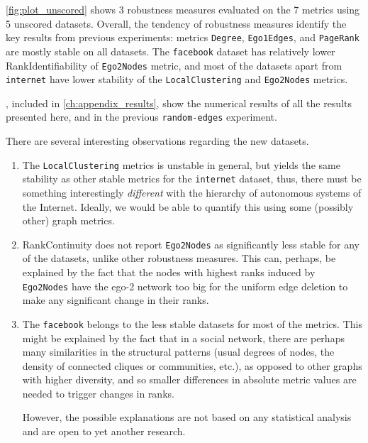 

\autoref{fig:plot_unscored} shows 3 robustness measures evaluated on the 7 metrics using 5 unscored datasets.
Overall, the tendency of robustness measures identify the key results from previous experiments: metrics \texttt{Degree}, \texttt{Ego1Edges}, and \texttt{PageRank} are mostly stable on all datasets.
The \texttt{facebook} dataset has relatively lower RankIdentifiability of \texttt{Ego2Nodes} metric, and most of the datasets apart from \texttt{internet} have lower stability of the \texttt{LocalClustering} and \texttt{Ego2Nodes} metrics.

, included in \cref{ch:appendix_results}, show the numerical results of all the results presented here, and in the previous \texttt{random-edges} experiment.

There are several interesting observations regarding the new datasets.

\begin{enumerate}
    \item The \texttt{LocalClustering} metrics is unstable in general, but yields the same stability as other stable metrics for the \texttt{internet} dataset, thus, there must be something interestingly \textsl{different} with the hierarchy of autonomous systems of the Internet.
    Ideally, we would be able to quantify this using some (possibly other) graph metrics.

    \item RankContinuity does not report \texttt{Ego2Nodes} as significantly less stable for any of the datasets, unlike other robustness measures.
    This can, perhaps, be explained by the fact that the nodes with highest ranks induced by \texttt{Ego2Nodes} have the ego-2 network too big for the uniform edge deletion to make any significant change in their ranks.
    \item The \texttt{facebook} belongs to the less stable datasets for most of the metrics.
    This might be explained by the fact that in a social network, there are perhaps many similarities in the structural patterns (usual degrees of nodes, the density of connected cliques or communities, etc.), as opposed to other graphs with higher diversity, and so smaller differences in absolute metric values are needed to trigger changes in ranks.

    However, the possible explanations are not based on any statistical analysis and are open to yet another research.
\end{enumerate}

